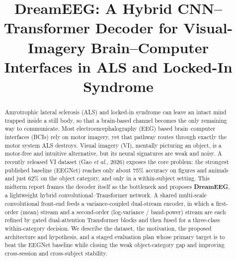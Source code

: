\documentclass[conference]{IEEEtran}
\begin{document}
\title{DreamEEG: A Hybrid CNN--Transformer Decoder for Visual-Imagery
Brain--Computer Interfaces in ALS and Locked-In Syndrome}

\author{
\and
{}
}

\maketitle

\begin{abstract}
Amyotrophic lateral sclerosis (ALS) and locked-in syndrome can leave an
intact mind trapped inside a still body, so that a brain-based channel
becomes the only remaining way to communicate. Most electroencephalography
(EEG) based brain--computer interfaces (BCIs) rely on motor imagery, yet
that pathway routes through exactly the motor system ALS destroys. Visual
imagery (VI), mentally picturing an object, is a motor-free and intuitive
alternative, but its neural signatures are weak and noisy. A recently
released VI dataset (Gao \textit{et al.}, 2026) exposes the core problem:
the strongest published baseline (EEGNet) reaches only about 75\% accuracy
on figures and animals and just 62\% on the object category, and only in a
within-subject setting. This midterm report frames the decoder itself as the
bottleneck and proposes \textbf{DreamEEG}, a lightweight hybrid
convolutional--Transformer network. A shared multi-scale convolutional
front-end feeds a variance-coupled dual-stream encoder, in which a
first-order (mean) stream and a second-order (log-variance / band-power)
stream are each refined by gated dual-attention Transformer blocks and then
fused for a three-class within-category decision. We describe the dataset,
the motivation, the proposed architecture and hypothesis, and a staged
evaluation plan whose primary target is to beat the EEGNet baseline while
closing the weak object-category gap and improving cross-session and
cross-subject stability.
\end{abstract}
\end{document}
